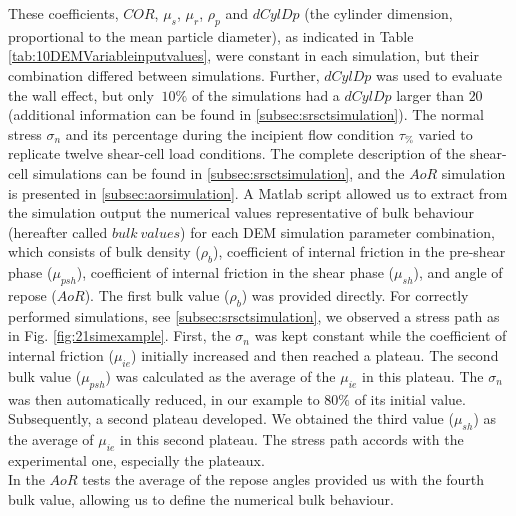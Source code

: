 \documentclass{llncs}
\begin{document}
These coefficients, $COR$, $\mu_s$, $\mu_r$,
$\rho_p$ and $dCylDp$ (the cylinder dimension, proportional to the mean
particle diameter), as indicated in Table \ref{tab:10DEMVariableinputvalues}, 
were constant in each simulation, but their combination differed between
simulations.
Further, $dCylDp$ was used to evaluate the wall effect, but only $~10\%$ of the
simulations had a $dCylDp$ larger than $20$ (additional information can be found
in \ref{subsec:srsctsimulation}).
The normal stress $\sigma_n$ and its
percentage during the incipient flow condition $\tau_{\%}$
varied to replicate twelve shear-cell load conditions. 
The complete description of the shear-cell simulations can be found in \ref{subsec:srsctsimulation}, 
and the $AoR$ simulation is presented in \ref{subsec:aorsimulation}.
A Matlab script allowed us to extract from the simulation output the numerical
values representative of bulk behaviour (hereafter called $bulk ~ values$)
for each DEM simulation parameter combination, which consists of
bulk density ($\rho_b$),
coefficient of internal friction in the pre-shear phase ($\mu_{psh}$),
coefficient of internal friction in the shear phase ($\mu_{sh}$),
and angle of repose ($AoR$).
The first bulk value ($\rho_b$) was provided directly. 
For correctly performed simulations, see \ref{subsec:srsctsimulation}, we
observed a stress path as in Fig. \ref{fig:21simexample}.
First, the $\sigma_n$ was kept constant while the coefficient of internal
friction ($\mu_{ie}$) initially increased and then reached a plateau.
The second bulk value ($\mu_{psh}$) was calculated as the average of the
$\mu_{ie}$ in this plateau.
The $\sigma_n$ was then automatically reduced, in our example to $80 \%$ of
its initial value.
Subsequently, a second plateau developed.
We obtained the third
value ($\mu_{sh}$) as the average of $\mu_{ie}$ in this second plateau.
The stress path accords with the experimental one, especially the plateaux.\\
In the $AoR$ tests the average of the repose angles provided us with the fourth
bulk value, allowing us to define the numerical bulk behaviour.
\end{document}
